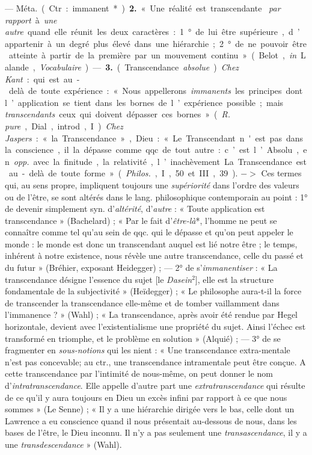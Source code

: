 \begin{itemize}[leftmargin=1cm, label=, itemsep=1pt]
— \si{Méta.} (Ctr. : immanent*). {\bf 2.} « Une réalité est transcendante {\it
par rapport} à {\it une autre} quand elle réunit les deux caractères : 1° de
lui être supérieure, d’appartenir à un degré plus élevé dans une hiérarchie;
2° de ne pouvoir être atteinte à partir de la première par un mouvement
continu » (Belot, {\it in} Lalande, {\it Vocabulaire}). —  {\bf 3.}
(Transcendance {\it absolue}). {\it Chez Kant} : qui est au-delà de toute
expérience : « Nous appellerons {\it immanents} les principes dont
l’application se tient dans les bornes de l’expérience possible ; mais {\it
transcendants} ceux qui doivent dépasser ces bornes » ({\it R. pure}, Dial.,
introd., I). {\it Chez Jaspers} : « la Transcendance », Dieu : « Le
Transcendant n'est pas dans la conscience, il la dépasse comme qqc. de tout
autre : c’est l’Absolu, en {\it opp.} avec la finitude, la relativité,
l’inachèvement... La Transcendance est au-delà de toute forme » ({\it Philos.},
I, 50 et III, 39). $->$ Ces termes qui, au sens propre, impliquent toujours une
{\it supériorité} dans l’ordre des valeurs
ou de l’être, se sont altérés dans le lang. philosophique contemporain au
point : 1° de devenir simplement syn. d’{\it altérité}, d'{\it autre} : «
Toute application est transcendance » (Bachelard) ; « Par le fait
d’{\it être-là}*, l’homme ne peut se connaître comme tel qu’au sein de qqc.
qui le dépasse et qu’on peut appeler le monde : le monde est donc un
transcendant auquel est lié notre être ; le temps, inhérent à notre
existence, nous révèle une autre transcendance, celle du passé et du futur
» (Bréhier, exposant Heidegger) ; — 2° de s’{\it immanentiser} : « La
transcendance désigne l'essence du sujet [le {\it Dasein}$^2$], elle est la
structure fondamentale de la subjectivité » (Heïdegger) ; « Le philosophe
aura-t-il la force de transcender la transcendance elle-même et de tomber
vaillamment dans l'immanence ? » (Wahl) ; « La transcendance, après avoir été
rendue par Hegel horizontale, devient avec l’existentialisme une propriété du
sujet. Ainsi l'échec est transformé en triomphe, et le problème en solution
» (Alquié) ; — 3° de se fragmenter en {\it sous-notions} qui les nient : «
Une transcendance extra-mentale n’est pas concevable; au ctr., une
transcendance intramentale peut être conçue. A cette transcendance par
l'intimité de nous-même, on peut donner le nom d’{\it intratranscendance}.
Elle appelle d'autre part une {\it extratranscendance} qui résulte de ce
qu’il y aura toujours en Dieu un excès infini par rapport à ce que nous
sommes » (Le Senne) ; « Il y a une hiérarchie dirigée vers le bas, celle dont
un Lawrence a eu conscience quand il nous présentait au-dessous de nous, dans
les bases de l'être, le Dieu inconnu. Il n’y a pas seulement une
{\it transascendance}, il y a une {\it transdescendance} » (Wahl).


\end{itemize}
